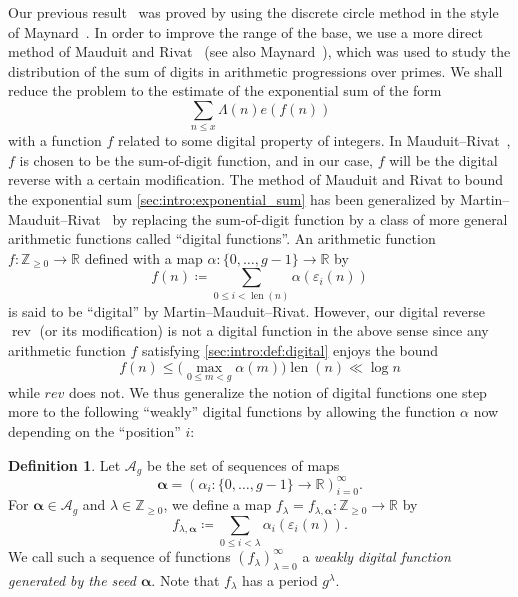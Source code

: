 \documentclass[hidelinks]{amsart}
\numberwithin{equation}{section}
\theoremstyle{plain}
\theoremstyle{definition}
\newtheorem{definition}{Definition}
\newcommand{\textdf}[1]{\textsl{#1}}
\let\tmp\phi
\let\phi\varphi
\let\varphi\tmp
\let\tmp\epsilon
\let\epsilon\varepsilon
\let\varepsilon\tmp
\DeclareMathOperator{\rev}{rev}
\DeclareMathOperator{\len}{len}
\begin{document}
Our previous result~\cite{BhowmikSuzuki:Telhcirid}
was proved by using the discrete circle method
in the style of Maynard~\cite{Maynard:PnP}.
In order to improve the range of the base,
we use a more direct method of Mauduit and Rivat~\cite{MauduitRivat:Gelfond}
(see also Maynard~\cite{Maynard:RestrictedDigitP}),
which was used to study the distribution of the sum of digits in arithmetic progressions over primes.
We shall reduce the problem to the estimate of the exponential sum of the form
\begin{equation}
\label{sec:intro:exponential_sum}
\sum_{n\le x}\Lambda(n)e(f(n))
\end{equation}
with a function $f$ related to some digital property of integers.
In Mauduit--Rivat~\cite{MauduitRivat:Gelfond},
$f$ is chosen to be the sum-of-digit function,
and in our case, $f$ will be the digital reverse with a certain modification.
The method of Mauduit and Rivat to bound the exponential sum \cref{sec:intro:exponential_sum}
has been generalized by Martin--Mauduit--Rivat~\cite{MartinMauduitRivat:Digital}
by replacing the sum-of-digit function
by a class of more general arithmetic functions called ``digital functions''.
An arithmetic function $f\colon\mathbb{Z}_{\ge0}\to\mathbb{R}$
defined with a map $\alpha\colon\{0,\ldots,g-1\}\to\mathbb{R}$ by
\begin{equation}
\label{sec:intro:def:digital}
f(n)
\coloneqq
\sum_{0\le i<\len(n)}\alpha(\epsilon_{i}(n))
\end{equation}
is said to be ``digital'' by Martin--Mauduit--Rivat.
However, our digital reverse $\rev$ (or its modification) is not a digital function in the above sense
since any arithmetic function $f$ satisfying \cref{sec:intro:def:digital} enjoys the bound
\[
f(n)
\le
\biggl(\max_{0\le m<g}\alpha(m)\biggr)\len(n)
\ll
\log n
\]
while $rev$ does not. We thus generalize the notion of digital functions
one step more to the following ``weakly'' digital functions
by allowing the function $\alpha$ now depending on the ``position'' $i$:
\begin{definition}
\label{def:}
Let $\mathscr{A}_{g}$ be the set of sequences of maps
\[
\bm{\alpha}=(\alpha_{i}\colon\{0,\ldots,g-1\}\to\mathbb{R})_{i=0}^{\infty}.
\]
For $\bm{\alpha}\in\mathscr{A}_{g}$ and $\lambda\in\mathbb{Z}_{\ge0}$, we define a map
$f_{\lambda}=f_{\lambda,\bm{\alpha}}\colon\mathbb{Z}_{\ge0}\to\mathbb{R}$
by
\[
f_{\lambda,\bm{\alpha}}
\coloneqq
\sum_{0\le i<\lambda}\alpha_{i}(\epsilon_{i}(n)).
\]
We call such a sequence of functions $(f_{\lambda})_{\lambda=0}^{\infty}$
a \textdf{weakly digital function generated by the seed $\bm{\alpha}$}.
Note that $f_{\lambda}$ has a period $g^{\lambda}$.
\end{definition}
\end{document}
